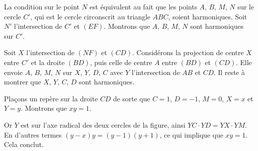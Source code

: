 \begin{sol}
\begin{center}

\end{center}

La condition sur le point $N$ est équivalent au fait que les points $A$, $B$, $M$, $N$ sur le cercle $C'$, qui est le cercle circonscrit au triangle $ABC$, soient harmoniques. Soit $N'$ l'intersection de $C'$ et $(EF)$. Montrons que $A$, $B$, $M$, $N$ sont harmoniques sur $C'$.

\medskip

Soit $X$ l'intersection de $(NF)$ et $(CD)$. Considérons la projection de centre $X$ entre $C'$ et la droite $(BD)$, puis celle de centre $A$ entre $(BD)$ et $(CD)$. Elle envoie $A$, $B$, $M$, $N$ sur $X$, $Y$, $D$, $C$ avec $Y$ l'intersection de $AB$ et $CD$. Il reste à montrer que $X$, $Y$, $C$, $D$ sont harmoniques.

\medskip

Plaçons un repère sur la droite $CD$ de sorte que $C=1$, $D=-1$, $M=0$, $X=x$ et $Y=y$. Montrons que $xy=1$.

Or $Y$ est sur l'axe radical des deux cercles de la figure, ainsi $YC\cdot YD=YX\cdot YM$. En d'autres termes $(y-x)y = (y - 1)(y + 1)$, ce qui implique que $xy = 1$. Cela conclut.
\end{sol}


